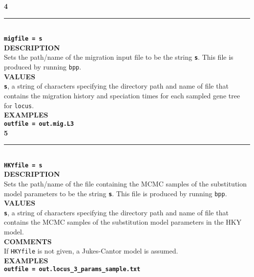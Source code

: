 \documentclass[11pt]{article}
\begin{document}
\noindent\textbf{{\large 4}} \\
\noindent\rule{\textwidth}{0.8pt} \\
\textbf{{\Large \texttt{migfile = s}}} \vspace{5pt}\\
\textbf{DESCRIPTION} \vspace{5pt}\\
Sets the path/name of the migration input file to be the string \textbf{\texttt{s}}. 
This file is produced by running \texttt{bpp}. \vspace{5pt}\\
\textbf{VALUES} \vspace{5pt}\\
\textbf{\texttt{s}}, a string of characters specifying the directory path and name of file that contains the migration history and speciation times for each sampled gene tree for \texttt{locus}. \vspace{5pt}\\
\textbf{EXAMPLES} \vspace{5pt}\\
\textbf{\texttt{outfile = out.mig.L3}} \vspace{10pt}\\

\noindent\textbf{{\large 5}} \\
\noindent\rule{\textwidth}{0.8pt} \\
\textbf{{\Large \texttt{HKYfile = s}}} \vspace{5pt}\\
\textbf{DESCRIPTION} \vspace{5pt}\\
Sets the path/name of the file containing the MCMC samples of the substitution model parameters to be the string \textbf{\texttt{s}}. 
This file is produced by running \texttt{bpp}.
 \vspace{5pt}\\
\textbf{VALUES} \vspace{5pt}\\
\textbf{\texttt{s}}, a string of characters specifying the directory path and name of file that contains the MCMC samples of the substitution model parameters in the HKY model. \vspace{5pt}\\
\textbf{COMMENTS} \vspace{5pt}\\
If \texttt{HKYfile} is not given, a Jukes-Cantor model is assumed. 
\vspace{5pt}\\
\textbf{EXAMPLES} \vspace{5pt}\\
\textbf{\texttt{outfile = out.locus\_3\_params\_sample.txt}} \vspace{10pt}\\
\end{document}

